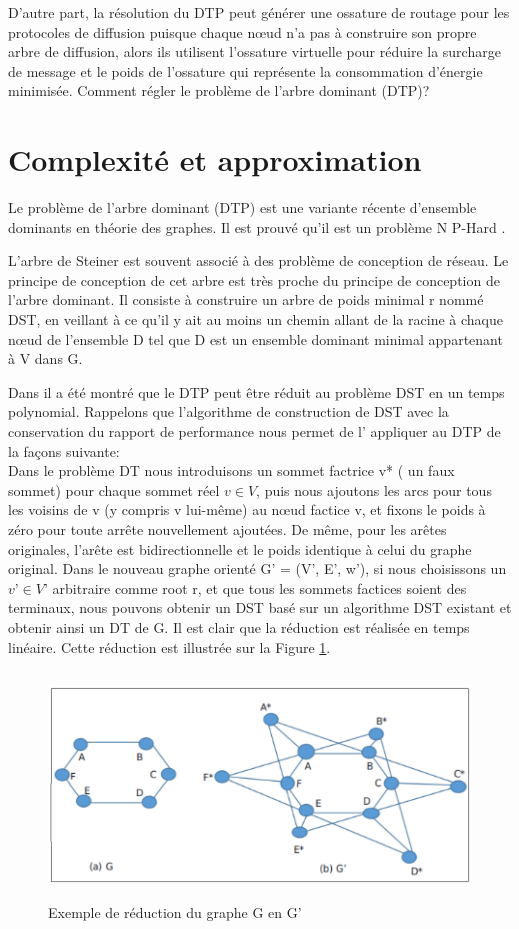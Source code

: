 D’autre part, la résolution du DTP peut générer une ossature de routage pour les protocoles de diffusion puisque chaque nœud n’a pas à construire son propre arbre de diffusion, alors ils utilisent l'ossature virtuelle pour réduire la surcharge de message et le poids de l'ossature qui représente la consommation d'énergie minimisée. Comment régler le problème de l’arbre dominant (DTP)? 


\section{Complexité et approximation}
Le problème de l’arbre dominant (DTP) est une variante récente d’ensemble dominants en théorie des graphes. Il est prouvé qu'il est un problème N P-Hard \cite{shin2010approximation,zhang2008new}.

L’arbre de Steiner est souvent associé à des problème de conception de réseau. Le principe de conception de cet arbre est très proche du principe de conception de l’arbre dominant. Il consiste à construire un arbre de poids minimal r nommé DST, en veillant à ce qu'il y ait au moins un chemin allant de la racine à chaque nœud de l'ensemble D tel que D est un ensemble dominant minimal appartenant à V dans G.

Dans \cite{shin2010approximation} il a été montré que le DTP peut être réduit au problème DST en un temps polynomial. Rappelons que l’algorithme de construction de DST avec la conservation du rapport de performance nous permet de l’ appliquer au DTP de la façons suivante:\\
Dans le problème DT nous introduisons un sommet factrice v* ( un faux sommet) pour chaque sommet réel $v \in V$,  puis nous ajoutons les arcs pour tous les voisins de v (y compris v lui-même) au nœud factice v, et fixons le poids à zéro pour toute arrête nouvellement ajoutées. De même, pour les arêtes originales, l’arête est bidirectionnelle et le poids identique à celui du graphe original. Dans le nouveau graphe orienté G’ = (V’, E’, w’), si nous choisissons un $v’ \in V’$ arbitraire comme root r, et que tous les sommets factices soient des terminaux, nous pouvons obtenir un DST basé sur un algorithme DST existant \cite{zhang2008new} et obtenir ainsi un DT de G. Il est clair que la réduction est réalisée en temps linéaire. Cette réduction est illustrée sur la Figure \ref{fig:31}.\\

\begin{figure}[H]
	\centering
	\includegraphics[width=15cm,height=6cm]{Chap3/1.png}
	\caption{Exemple de réduction du graphe G en G’}
	\label{fig:31}
\end{figure}

